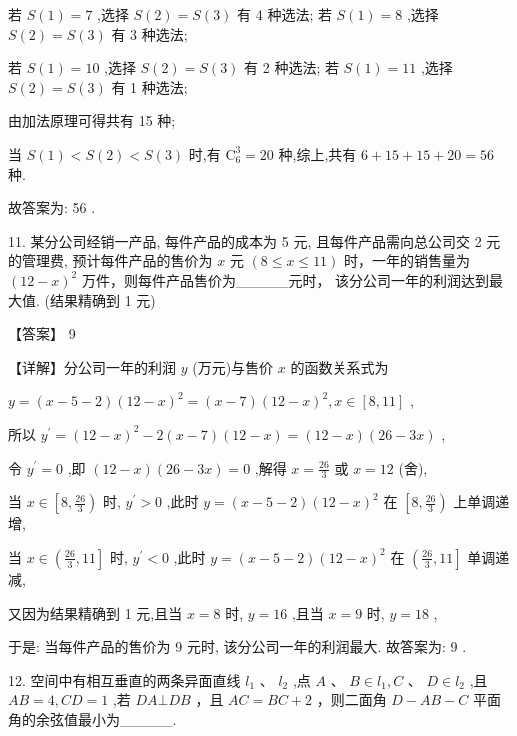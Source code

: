 \documentclass[10pt]{article}
\newcommand*\circled[1]{\tikz[baseline=(char.base)]{\node[shape=circle,draw,inner sep=1.5pt] (char) {\small #1};}}
\begin{document}
若 \(S\left( 1\right)  = 7\) ,选择 \(S\left( 2\right)  = S\left( 3\right)\) 有 4 种选法; 若 \(S\left( 1\right)  = 8\) ,选择 \(S\left( 2\right)  = S\left( 3\right)\) 有 3 种选法;

若 \(S\left( 1\right)  = {10}\) ,选择 \(S\left( 2\right)  = S\left( 3\right)\) 有 2 种选法; 若 \(S\left( 1\right)  = {11}\) ,选择 \(S\left( 2\right)  = S\left( 3\right)\) 有 1 种选法;

由加法原理可得共有 15 种;

 \circled{4}  当 \(S\left( 1\right)  < S\left( 2\right)  < S\left( 3\right)\) 时,有 \({\mathrm{C}}_{6}^{3} = {20}\) 种,综上,共有 \(6 + {15} + {15} + {20} = {56}\) 种.

故答案为: 56 .

11. 某分公司经销一产品, 每件产品的成本为 5 元, 且每件产品需向总公司交 2 元的管理费, 预计每件产品的售价为 \(x\) 元 \(\left( {8 \leq  x \leq  {11}}\right)\) 时，一年的销售量为 \({\left( {12} - x\right) }^{2}\) 万件，则每件产品售价为\_\_\_\_\_元时， 该分公司一年的利润达到最大值. (结果精确到 1 元)

【答案】 9

【详解】分公司一年的利润 \(y\) (万元)与售价 \(x\) 的函数关系式为

\(y = \left( {x - 5 - 2}\right) {\left( {12} - x\right) }^{2} = \left( {x - 7}\right) {\left( {12} - x\right) }^{2},x \in  \left\lbrack  {8,{11}}\right\rbrack\) ,

所以 \({y}^{\prime } = {\left( {12} - x\right) }^{2} - 2\left( {x - 7}\right) \left( {{12} - x}\right)  = \left( {{12} - x}\right) \left( {{26} - {3x}}\right)\) ,

令 \({y}^{\prime } = 0\) ,即 \(\left( {{12} - x}\right) \left( {{26} - {3x}}\right)  = 0\) ,解得 \(x = \frac{26}{3}\) 或 \(x = {12}\) (舍),

当 \(x \in  \left\lbrack  {8,\frac{26}{3}}\right)\) 时, \({y}^{\prime } > 0\) ,此时 \(y = \left( {x - 5 - 2}\right) {\left( {12} - x\right) }^{2}\) 在 \(\left\lbrack  {8,\frac{26}{3}}\right)\) 上单调递增,

当 \(x \in  \left( {\frac{26}{3},{11}}\right\rbrack\) 时, \({y}^{\prime } < 0\) ,此时 \(y = \left( {x - 5 - 2}\right) {\left( {12} - x\right) }^{2}\) 在 \(\left( {\frac{26}{3},{11}}\right\rbrack\) 单调递减,

又因为结果精确到 1 元,且当 \(x = 8\) 时, \(y = {16}\) ,且当 \(x = 9\) 时, \(y = {18}\) ,

于是: 当每件产品的售价为 9 元时, 该分公司一年的利润最大. 故答案为: 9 .

12. 空间中有相互垂直的两条异面直线 \({l}_{1}\text{ 、 }{l}_{2}\) ,点 \(A\text{ 、 }B \in  {l}_{1},C\text{ 、 }D \in  {l}_{2}\) ,且 \({AB} = 4,{CD} = 1\) ,若 \({DA}\bot {DB}\) ，且 \({AC} = {BC} + 2\) ，则二面角 \(D - {AB} - C\) 平面角的余弦值最小为\_\_\_\_\_.
\end{document}
